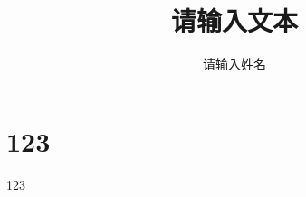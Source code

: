 \documentclass{first} %
\title{请输入文本}
\author{请输入姓名}
\begin{document}
    \maketitle
    \section{123}
    123
\end{document}
